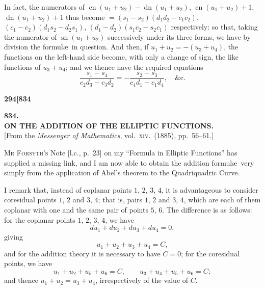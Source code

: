 \documentclass[11pt]{article}
\begin{document}
\noindent In fact, the numerators of $\operatorname{cn}(u_{1} + u_{2}) - \operatorname{dn}(u_{1} + u_{2})$, $\operatorname{cn}(u_{1} + u_{2}) + 1$, $\operatorname{dn}(u_{1} + u_{2}) + 1$ thus become $= (s_{1} - s_{2})(d_{1}d_{2} - c_{1}c_{2})$, $(c_{1} - c_{2})(d_{1}s_{2} - d_{2}s_{1})$, $(d_{1} - d_{2})(s_{1}c_{2} - s_{2}c_{1})$ respectively: so that, taking the numerator of $\operatorname{sn}(u_{1} + u_{2})$ successively under its three forms, we have by division the formul\ae\ in question. And then, if $u_{1} + u_{2} = -(u_{3} + u_{4})$, the functions on the left-hand side become, with only a change of sign, the like functions of $u_{3} + u_{4}$; and we thence have the required equations
\[
\frac{s_{1} - s_{4}}{c_{2}d_{3} - c_{3}d_{2}} = -\frac{s_{2} - s_{3}}{c_{4}d_{1} - c_{1}d_{4}},\quad\&\text{c.}
\]


\newpage

\noindent\textbf{294}\hfill\hfill\textbf{[834}

\bigskip

\begin{center}
{\large\textbf{834.}}\\[0.7em]
{\large\textbf{ON THE ADDITION OF THE ELLIPTIC FUNCTIONS.}}\\[1em]
{\small [From the \textit{Messenger of Mathematics}, vol.\ \textsc{xiv}.\ (1885), pp.\ 56--61.]}
\end{center}

\bigskip

\noindent \textsc{Mr Forsyth's} Note [l.c., p.\ 23] on my ``Formula in Elliptic Functions'' has supplied a missing link, and I am now able to obtain the addition formul\ae\ very simply from the application of Abel's theorem to the Quadriquadric Curve.

\medskip

I remark that, instead of coplanar points $1$, $2$, $3$, $4$, it is advantageous to consider coresidual points $1$, $2$ and $3$, $4$; that is, pairs $1$, $2$ and $3$, $4$, which are each of them coplanar with one and the same pair of points $5$, $6$. The difference is as follows: for the coplanar points $1$, $2$, $3$, $4$, we have
\[
du_{1} + du_{2} + du_{3} + du_{4} = 0,
\]
giving
\[
u_{1} + u_{2} + u_{3} + u_{4} = C,
\]
and for the addition theory it is necessary to have $C = 0$; for the coresidual points, we have
\[
u_{1} + u_{2} + u_{5} + u_{6} = C,\qquad u_{3} + u_{4} + u_{5} + u_{6} = C;
\]
and thence $u_{1} + u_{2} = u_{3} + u_{4}$, irrespectively of the value of $C$.
\end{document}
